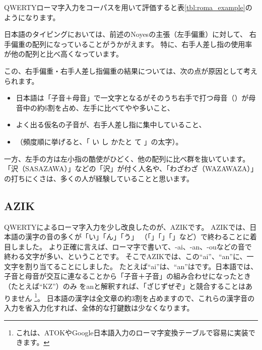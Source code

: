 QWERTYローマ字入力をコーパスを用いて評価すると表\ref{tbl:roma_example}のようになります。

日本語のタイピングにおいては、前述のNoyesの主張（左手偏重）に対して、
右手偏重の配列になっていることがうかがえます。
特に、右手人差し指の使用率が他の配列と比べ高くなっています。

この、右手偏重・右手人差し指偏重の結果については、次の点が原因として考えられます。
\begin{itemize}
\item 日本語は「子音＋母音」で一文字となるがそのうち右手で打つ母音（）が母音中の約6割を占め、左手に比べてやや多いこと、
\item よく出る仮名の子音が、右手人差し指に集中していること、
\item[　] \hspace{1zw}（頻度順に挙げると、「%
{\footnotesize い}%
%
%
{\footnotesize し}%
%
{\footnotesize かたと}%
%
{\footnotesize て}%
%
」の太字）。
\end{itemize}

一方、左手の方は左小指の酷使がひどく、他の配列に比べ群を抜いています。「沢（SASAZAWA）」などの「沢」が付く人名や、「わざわざ（WAZAWAZA）」の打ちにくさは、多くの人が経験していることと思います。


\subsection{AZIK}

QWERTYによるローマ字入力を少し改良したのが、AZIKです。
AZIKでは、日本語の漢字の音の多くが「い」「ん」「う」
（「」「」「」など）で終わることに着目しました。
より正確に言えば、ローマ字で書いて、-ai、-an、-ouなどの音で終わる文字が多い、ということです。
そこでAZIKでは、この``ai''、``an''に、一文字を割り当てることにしました。
たとえば``ai''は、``an''はです。日本語では、子音と母音が交互に連なることから「子音＋子音」の組み合わせになったとき（たとえば``KZ''）のみ
をanと解釈すれば、「ざじずぜぞ」と競合することはありません%
\footnote{これは、ATOKやGoogle日本語入力のローマ字変換テーブルで容易に実装できます。}。%
日本語の漢字は全文章の約3割を占めますので、これらの漢字音の入力を省入力化すれば、全体的な打鍵数は少なくなります。

